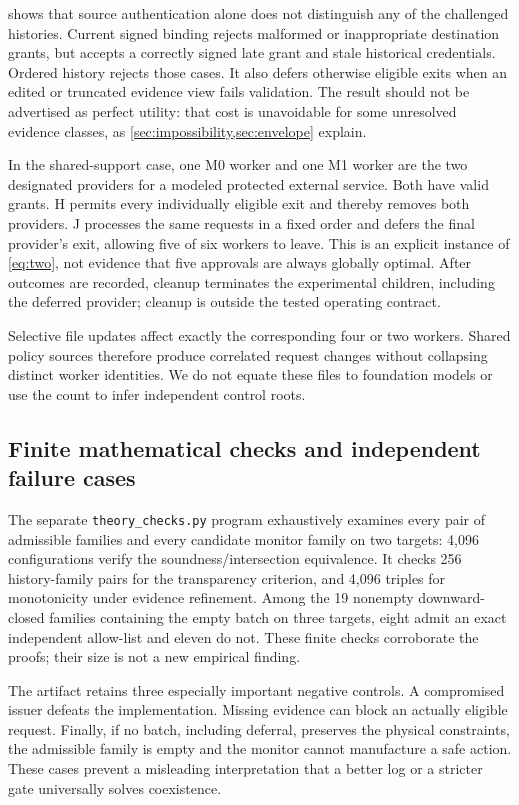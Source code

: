 shows that source authentication alone does not distinguish any of the challenged histories. Current signed binding rejects malformed or inappropriate destination grants, but accepts a correctly signed late grant and stale historical credentials. Ordered history rejects those cases. It also defers otherwise eligible exits when an edited or truncated evidence view fails validation. The result should not be advertised as perfect utility: that cost is unavoidable for some unresolved evidence classes, as \cref{sec:impossibility,sec:envelope} explain.

In the shared-support case, one M0 worker and one M1 worker are the two designated providers for a modeled protected external service. Both have valid grants. H permits every individually eligible exit and thereby removes both providers. J processes the same requests in a fixed order and defers the final provider's exit, allowing five of six workers to leave. This is an explicit instance of \cref{eq:two}, not evidence that five approvals are always globally optimal. After outcomes are recorded, cleanup terminates the experimental children, including the deferred provider; cleanup is outside the tested operating contract.

Selective file updates affect exactly the corresponding four or two workers. Shared policy sources therefore produce correlated request changes without collapsing distinct worker identities. We do not equate these files to foundation models or use the count to infer independent control roots.

\subsection{Finite mathematical checks and independent failure cases}
The separate \texttt{theory\_checks.py} program exhaustively examines every pair of admissible families and every candidate monitor family on two targets: 4,096 configurations verify the soundness/intersection equivalence. It checks 256 history-family pairs for the transparency criterion, and 4,096 triples for monotonicity under evidence refinement. Among the 19 nonempty downward-closed families containing the empty batch on three targets, eight admit an exact independent allow-list and eleven do not. These finite checks corroborate the proofs; their size is not a new empirical finding.

The artifact retains three especially important negative controls. A compromised issuer defeats the implementation. Missing evidence can block an actually eligible request. Finally, if no batch, including deferral, preserves the physical constraints, the admissible family is empty and the monitor cannot manufacture a safe action. These cases prevent a misleading interpretation that a better log or a stricter gate universally solves coexistence.

